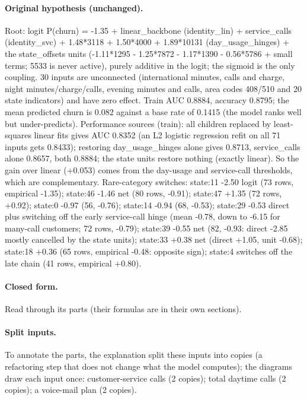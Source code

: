 \documentclass[a4paper,10pt]{article}
\newif\ifreviewmarks
\newcommand{\reviewrule}{\noindent{\color{BrickRed}\rule{\linewidth}{0.8pt}}}
\newenvironment{drafted}[1][]{%
  \ifreviewmarks\par\addvspace{\medskipamount}\reviewrule\par\nopagebreak
  \noindent{\color{BrickRed}\sffamily\footnotesize\textbf{Thesis Draft}\quad #1\hfill review}\par\nopagebreak\smallskip\fi}{%
  \ifreviewmarks\par\smallskip\noindent{\color{BrickRed}\sffamily\footnotesize end of thesis draft}\par\nopagebreak\reviewrule\par\medskip\fi}
\begin{document}
\begin{drafted}[plain-language layer: churn100-s4-c3]
\paragraph{Original hypothesis (unchanged).} Root: logit P(churn) = -1.35 + linear\_\allowbreak{}backbone (identity\_\allowbreak{}lin) + service\_\allowbreak{}calls (identity\_\allowbreak{}svc) + 1.48*3118 + 1.50*4000 + 1.89*10131 (day\_\allowbreak{}usage\_\allowbreak{}hinges) + the state\_\allowbreak{}offsets units (-1.11*1295 - 1.25*7872 - 1.17*1390 - 0.56*5786 + small terms; 5533 is never active), purely additive in the logit; the sigmoid is the only coupling. 30 inputs are unconnected (international minutes, calls and charge, night minutes/\allowbreak{}charge/\allowbreak{}calls,\allowbreak{} evening minutes and calls, area codes 408/510 and 20 state indicators) and have zero effect. Train AUC 0.8884, accuracy 0.8795; the mean predicted churn is 0.082 against a base rate of 0.1415 (the model ranks well but under-predicts). Performance sources (train): all children replaced by least-squares linear fits gives AUC 0.8352 (an L2 logistic regression refit on all 71 inputs gets 0.8433); restoring day\_\allowbreak{}usage\_\allowbreak{}hinges alone gives 0.8713, service\_\allowbreak{}calls alone 0.8657, both 0.8884; the state units restore nothing (exactly linear). So the gain over linear (+0.053) comes from the day-usage and service-call thresholds, which are complementary. Rare-category switches: state:11 -2.50 logit (73 rows, empirical -1.35); state:46 -1.46 net (80 rows, -0.91); state:47 +1.35 (72 rows, +0.92); state:0 -0.97 (56, -0.76); state:14 -0.94 (68, -0.53); state:29 -0.53 direct plus switching off the early service-call hinge (mean -0.78, down to -6.15 for many-call customers; 72 rows, -0.79); state:39 -0.55 net (82, -0.93: direct -2.85 mostly cancelled by the state units); state:33 +0.38 net (direct +1.05, unit -0.68); state:18 +0.36 (65 rows, empirical -0.48: opposite sign); state:4 switches off the late chain (41 rows, empirical +0.80).
\paragraph{Closed form.} Read through its parts (their formulas are in their own sections).
\paragraph{Split inputs.} To annotate the parts, the explanation split these inputs into copies (a refactoring step that does not change what the model computes); the diagrams draw each input once: customer-service calls (2 copies); total daytime calls (2 copies); a voice-mail plan (2 copies).

\end{drafted}
\end{document}
